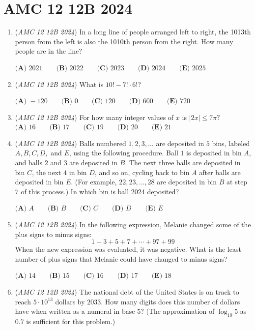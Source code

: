 \section{AMC 12 12B 2024}
        \begin{enumerate}
        	\item (\textit{AMC 12 12B 2024}) In a long line of people arranged left to right, the 1013th person from the left is also the 1010th person from the right. How many people are in the line?


 $\textbf{(A) } 2021 \qquad\textbf{(B) } 2022 \qquad\textbf{(C) } 2023 \qquad\textbf{(D) } 2024 \qquad\textbf{(E) } 2025$


	\item (\textit{AMC 12 12B 2024}) What is $10! - 7! \cdot 6!$?


 $\textbf{(A) }-120 \qquad\textbf{(B) }0 \qquad\textbf{(C) }120 \qquad\textbf{(D) }600 \qquad\textbf{(E) }720 \qquad$


	\item (\textit{AMC 12 12B 2024}) For how many integer values of $x$ is $|2x|\leq 7\pi?$
$\textbf{(A) }16 \qquad\textbf{(B) }17\qquad\textbf{(C) }19\qquad\textbf{(D) }20\qquad\textbf{(E) }21$


	\item (\textit{AMC 12 12B 2024}) Balls numbered $1,2,3,\ldots$ are deposited in $5$ bins, labeled $A,B,C,D,$ and $E$, using the following procedure. Ball $1$ is deposited in bin $A$, and balls $2$ and $3$ are deposited in $B$. The next three balls are deposited in bin $C$, the next $4$ in bin $D$, and so on, cycling back to bin $A$ after balls are deposited in bin $E$. (For example, $22,23,\ldots,28$ are deposited in bin $B$ at step 7 of this process.) In which bin is ball $2024$ deposited?


 $\textbf{(A) }A\qquad\textbf{(B) }B\qquad\textbf{(C) }C\qquad\textbf{(D) }D\qquad\textbf{(E) }E$


	\item (\textit{AMC 12 12B 2024}) In the following expression, Melanie changed some of the plus signs to minus signs:
 \[1 + 3+5+7+\cdots+97+99\]When the new expression was evaluated, it was negative. What is the least number of plus signs that Melanie could have changed to minus signs?


 $\textbf{(A) }14 \qquad \textbf{(B) }15 \qquad \textbf{(C) }16 \qquad \textbf{(D) }17 \qquad \textbf{(E) }18 \qquad$


	\item (\textit{AMC 12 12B 2024}) The national debt of the United States is on track to reach $5 \cdot 10^{13}$ dollars by $2033$. How many digits does this number of dollars have when written as a numeral in base $5$? (The approximation of $\log_{10} 5$ as $0.7$ is sufficient for this problem.)



\end{enumerate}
